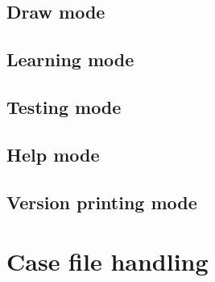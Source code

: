 \documentclass[%
	pdftex,
	oneside,        %
	11pt,           %
	parskip=half,   %
	headsepline,    %
	footsepline,    %
	abstracton,     %
	USenglish,      %
	a4paper,        %
]{report}
\begin{document}
\subsection{Draw mode}
\subsection{Learning mode}
\subsection{Testing mode}
\subsection{Help mode}
\subsection{Version printing mode}

\section{Case file handling}
\label{sec:CaseFile}
%

\lstlistoflistings
\printbibliography

\begin{appendices}




\end{appendices}
\end{document}
